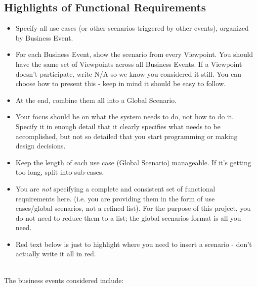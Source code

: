 \documentclass[]{article}
\begin{document}
\begin{enumerate}
\section{Highlights of Functional Requirements}
\label{sec:functional_requirements}
\begin{itemize}
	\item Specify all use cases (or other scenarios triggered by other events), organized by Business Event. 
	\item For each Business Event, show the scenario from every Viewpoint. You should have the same set of Viewpoints across all Business Events. If a Viewpoint doesn't participate, write N/A so we know you considered it still. You can choose how to present this - keep in mind it should be easy to follow. 
	\item At the end, combine them all into a Global Scenario.
	\item Your focus should be on what the system needs to do, not how to do it. Specify it in enough detail that it clearly specifies what needs to be accomplished, but not so detailed that you start programming or making design decisions.
	\item Keep the length of each use case (Global Scenario) manageable. If it's getting too long, split into sub-cases.
	\item You are \emph{not} specifying a complete and consistent set of functional requirements here. (i.e. you are providing them in the form of use cases/global scenarios, not a refined list). For the purpose of this project, you do not need to reduce them to a list; the global scenarios format is all you need.
	\item Red text below is just to highlight where you need to insert a scenario - don't actually write it all in red.
\end{itemize}

 \\

\noindent The business events considered include:


\end{enumerate}
\end{document}
